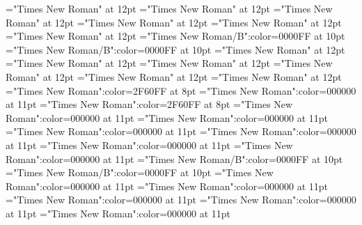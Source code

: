 \documentclass[a4paper]{article}
\begin{document}
\font\xitemptdefinitionLcptsensesensesentrybletDatadicBody="Times New Roman" at 12pt
\font{}="Times New Roman" at 12pt
\font\partofspeechptgrammaticalinfosensesensesentrybletDatadicBody="Times New Roman" at 12pt
\font\grammaticalinfosensesensesentrybletDatadicBody="Times New Roman" at 12pt
\font\sensesensesentrybletDatadicBody="Times New Roman" at 12pt
\font\sensesentrybletDatadicBody="Times New Roman" at 12pt
\font\headwordafterentrybletDatadicBody="Times New Roman/B":color=0000FF at 10pt
\font\headwordentrybletDatadicBody="Times New Roman/B":color=0000FF at 10pt
\font\CmPicturepublishStemCaptionCaptionPubptpictureCaptionpictureRightentrybletDatadicBody="Times New Roman" at 12pt
\font\CmPicturepublishStemCaptionSenseNumberpictureCaptionpictureRightentrybletDatadicBody="Times New Roman" at 12pt
\font\pictureCaptionpictureRightentrybletDatadicBody="Times New Roman" at 12pt
\font\picturepictureRightentrybletDatadicBody="Times New Roman" at 12pt
\font\pictureRightentrybletDatadicBody="Times New Roman" at 12pt
\font\entrybletDatadicBody="Times New Roman" at 12pt
\font\xlanguagetagxitemendefinitionLcptsensesensesentryletDatadicBody="Times New Roman":color=2F60FF at 8pt
\font\xitemendefinitionLcptsensesensesentryletDatadicBody="Times New Roman":color=000000 at 11pt
\font\xlanguagetagxitemptdefinitionLcptsensesensesentryletDatadicBody="Times New Roman":color=2F60FF at 8pt
\font\xitemptdefinitionLcptsensesensesentryletDatadicBody="Times New Roman":color=000000 at 11pt
\font{}="Times New Roman":color=000000 at 11pt
\font\partofspeechptgrammaticalinfosensesensesentryletDatadicBody="Times New Roman":color=000000 at 11pt
\font\grammaticalinfosensesensesentryletDatadicBody="Times New Roman":color=000000 at 11pt
\font\sensesensesentryletDatadicBody="Times New Roman":color=000000 at 11pt
\font\sensesentryletDatadicBody="Times New Roman":color=000000 at 11pt
\font\headwordafterentryletDatadicBody="Times New Roman/B":color=0000FF at 10pt
\font\headwordentryletDatadicBody="Times New Roman/B":color=0000FF at 10pt
\font\CmPicturepublishStemCaptionCaptionPubptpictureCaptionpictureRightentryletDatadicBody="Times New Roman":color=000000 at 11pt
\font\CmPicturepublishStemCaptionSenseNumberpictureCaptionpictureRightentryletDatadicBody="Times New Roman":color=000000 at 11pt
\font\pictureCaptionpictureRightentryletDatadicBody="Times New Roman":color=000000 at 11pt
\font\picturepictureRightentryletDatadicBody="Times New Roman":color=000000 at 11pt
\font\pictureRightentryletDatadicBody="Times New Roman":color=000000 at 11pt
\end{document}
